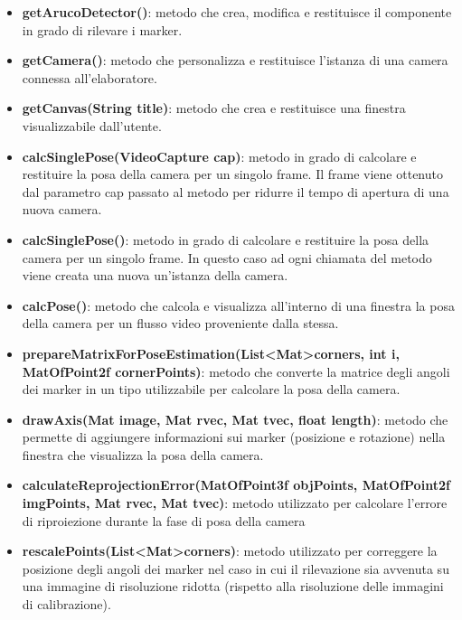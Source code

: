 \documentclass[12pt,a4paper,openright,twoside]{book}
\begin{document}
\vspace{0.5cm}
\begin{itemize}
	\item \textbf{getArucoDetector()}: metodo che crea, modifica e restituisce il componente in grado di rilevare i marker.
	\item \textbf{getCamera()}: metodo che personalizza e restituisce l'istanza di una camera connessa all'elaboratore.
	\item \textbf{getCanvas(String title)}: metodo che crea e restituisce una finestra visualizzabile dall'utente.
	\item \textbf{calcSinglePose(VideoCapture cap)}: metodo in grado di calcolare e restituire la posa della camera per un singolo frame.
	Il frame viene ottenuto dal parametro cap passato al metodo per ridurre il tempo di apertura di una nuova camera.
	\item \textbf{calcSinglePose()}: metodo in grado di calcolare e restituire la posa della camera per un singolo frame.
	In questo caso ad ogni chiamata del metodo viene creata una nuova un'istanza della camera.
	\item \textbf{calcPose()}: metodo che calcola e visualizza all'interno di una finestra la posa della camera per un flusso video proveniente dalla stessa.
	\item \textbf{prepareMatrixForPoseEstimation(List\textless Mat\textgreater corners, int i, MatOfPoint2f cornerPoints)}: metodo che converte la matrice degli angoli dei marker in un tipo utilizzabile per calcolare la posa della camera.
	\item \textbf{drawAxis(Mat image, Mat rvec, Mat tvec, float length)}: metodo che permette di aggiungere informazioni sui marker (posizione e rotazione) nella finestra che visualizza la posa della camera.
	\item \textbf{calculateReprojectionError(MatOfPoint3f objPoints, MatOfPoint2f imgPoints, Mat rvec, Mat tvec)}: metodo utilizzato per calcolare l'errore di riproiezione durante la fase di posa della camera
	\item \textbf{rescalePoints(List\textless Mat\textgreater corners)}: metodo utilizzato per correggere la posizione degli angoli dei marker nel caso in cui il rilevazione sia avvenuta su una immagine di risoluzione ridotta (rispetto alla risoluzione delle immagini di calibrazione).
\end{itemize}
\end{document}
